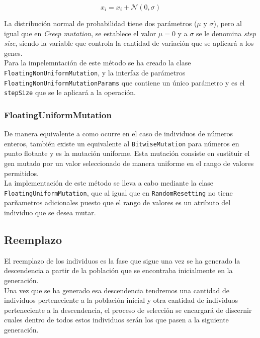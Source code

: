 \begin{equation}
    x_i = x_i + \mathcal{N}(0, \sigma)
\end{equation}

La distribución normal de probabilidad tiene dos parámetros ($\mu$ y $\sigma$), pero al igual que en \textit{Creep mutation}, se establece el valor $\mu = 0$ y a $\sigma$ se le denomina \textit{step size}, siendo la variable que controla la cantidad de variación que se aplicará a los genes. \\

Para la impelemntación de este método se ha creado la clase \texttt{FloatingNonUniformMutation}, y la interfaz de parámetros \texttt{FloatingNonUniformMutationParams} que contiene un único parámetro y es el \texttt{stepSize} que se le aplicará a la operación.

\subsubsection{FloatingUniformMutation}

De manera equivalente a como ocurre en el caso de individuos de números enteros, también existe un equivalente al \texttt{BitwiseMutation} para números en punto flotante y es la mutación uniforme. Esta mutación consiste en sustituir el gen mutado por un valor seleccionado de manera uniforme en el rango de valores permitidos. \\

La implementación de este método se lleva a cabo mediante la clase \texttt{FloatingUniformMutation}, que al igual que en \texttt{RandomResetting} no tiene parñametros adicionales puesto que el rango de valores es un atributo del individuo que se desea mutar.

\subsection{Reemplazo}

El reemplazo de los individuos es la fase que sigue una vez se ha generado la descendencia a partir de la población que se encontraba inicialmente en la generación. \\

Una vez que se ha generado esa descendencia tendremos una cantidad de individuos perteneciente a la población inicial y otra cantidad de individuos perteneciente a la descendencia, el proceso de selección se encargará de discernir cuales dentro de todos estos individuos serán los que pasen a la siguiente generación. \\

